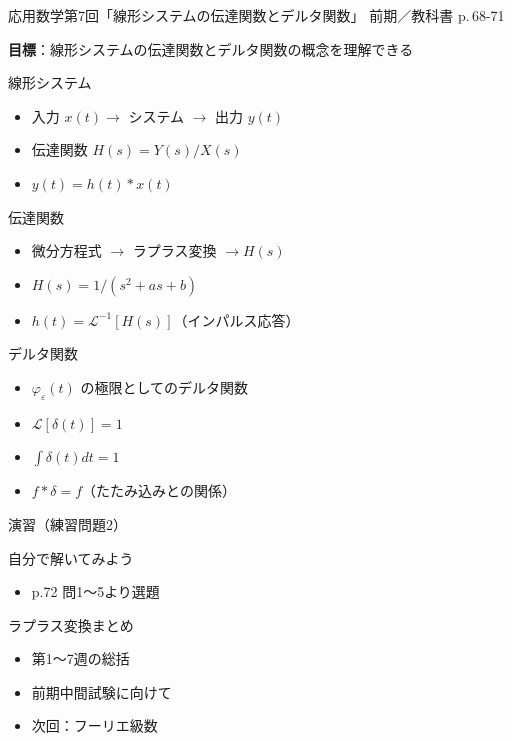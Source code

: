 \documentclass[aspectratio=43,professionalfonts,handout]{beamer}
\newcommand{\LectureNum}{7}
\newcommand{\LectureTitle}{線形システムの伝達関数とデルタ関数}
\newcommand{\TextPages}{p.\,68-71}
\newcommand{\CourseName}{応用数学}
\renewcommand{\TermName}{前期}
\begin{document}
\begin{frame}{\CourseName\quad 第\LectureNum 回「\LectureTitle」}
  {\small \TermName\quad \TeacherName\quad ／\quad 教科書 \TextPages}

  \textbf{目標}：線形システムの伝達関数とデルタ関数の概念を理解できる

\end{frame}

\begin{frame}{線形システム}
  \begin{block}{}
  \begin{itemize}
    \item 入力 $x(t) \to $ システム $ \to $ 出力 $y(t)$
    \item 伝達関数 $H(s) = Y(s)/X(s)$
    \item $y(t) = h(t)*x(t)$
  \end{itemize}
  \end{block}
\end{frame}

\begin{frame}{伝達関数}
  \begin{block}{}
  \begin{itemize}
    \item 微分方程式 $ \to $ ラプラス変換 $ \to H(s)$
    \item $H(s) = 1/(s^{2}+as+b)$
    \item $h(t) = \mathcal{L}^{-1}[H(s)]$（インパルス応答）
  \end{itemize}
  \end{block}
\end{frame}

\begin{frame}{デルタ関数}
  \begin{block}{}
  \begin{itemize}
    \item $\varphi_\varepsilon(t)$ の極限としてのデルタ関数
    \item $\mathcal{L}[\delta(t)] = 1$
    \item $\int\delta(t)dt = 1$
    \item $f*\delta = f$（たたみ込みとの関係）
  \end{itemize}
  \end{block}
\end{frame}

\begin{frame}{演習（練習問題2）}
  \begin{exampleblock}{自分で解いてみよう}
  \begin{itemize}
    \item p.72 問1〜5より選題
  \end{itemize}
  \end{exampleblock}
\end{frame}

\begin{frame}{ラプラス変換まとめ}
  \begin{itemize}
    \item 第1〜7週の総括
    \item 前期中間試験に向けて
    \item 次回：フーリエ級数
  \end{itemize}
\end{frame}
\end{document}

